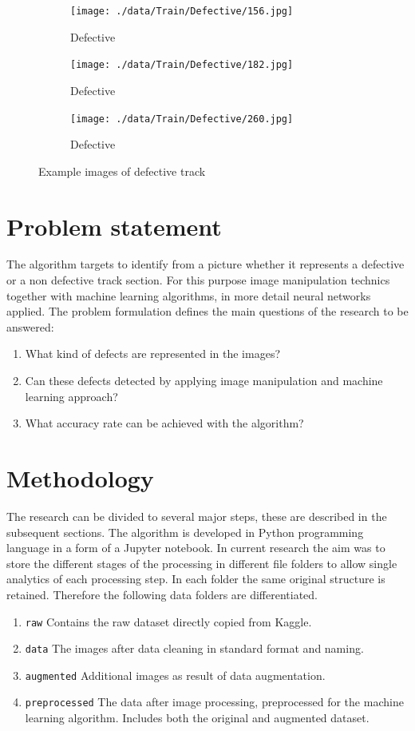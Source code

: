 \documentclass[10pt, final]{article}
\begin{document}
		\begin{figure}[!ht]
			\centering
			\begin{subfigure}{0.3\textwidth}
				\centering
				\texttt{[image: ./data/Train/Defective/156.jpg]}
				\caption{Defective}
			\end{subfigure}
			\begin{subfigure}{0.3\textwidth}
				\centering
				\texttt{[image: ./data/Train/Defective/182.jpg]}
				\caption{Defective}
			\end{subfigure}
			\begin{subfigure}{0.3\textwidth}
				\centering
				\texttt{[image: ./data/Train/Defective/260.jpg]}
				\caption{Defective}
			\end{subfigure}
			\caption{Example images of defective track}
			\label{fig:track_def}
		\end{figure}
	\section{Problem statement} \label{sec:prob_stat}
		The algorithm targets to identify from a picture whether it represents a defective or a non defective 
		track section.
		For this purpose image manipulation technics together with machine learning algorithms, in more detail 
		neural networks applied.
		The problem formulation defines the main questions of the research to be answered:
		\begin{enumerate}[label=Q\arabic*]
			\item \label{itm:Q1} What kind of defects are represented in the images?
			\item \label{itm:Q2} Can these defects detected by applying image manipulation 
				and machine learning approach? 
			\item \label{itm:Q3} What accuracy rate can be achieved with the algorithm?
		\end{enumerate}
	\section{Methodology} \label{sec:method}
		The research can be divided to several major steps, these are described in the subsequent sections.
		The algorithm is developed in Python programming language in a form of a Jupyter notebook.
		In current research the aim was to store the different stages of the processing in different file 
		folders to allow single analytics of each processing step. 
		In each folder the same original structure is retained.
		Therefore the following data folders are differentiated.
		\begin{enumerate}
			\item \lstinline{raw} Contains the raw dataset directly copied from Kaggle.
			\item \lstinline{data} The images after data cleaning in standard format and naming.
			\item \lstinline{augmented} Additional images as result of data augmentation.
			\item \lstinline{preprocessed} The data after image processing, preprocessed for the machine learning
				algorithm. Includes both the original and augmented dataset.
		\end{enumerate}
\end{document}
